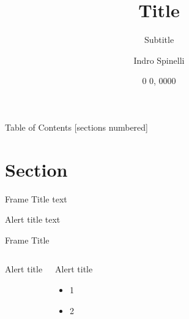 \documentclass[11pt,aspectratio=169]{beamer}
\title[Title]{Title}
\subtitle{Subtitle}
\date{0 0, 0000}
\author[I.Spinelli]{Indro Spinelli}
\institute[uniroma1]{Sapienza University of Rome}
\begin{document}
	
	\maketitle
    
	\begin{frame}{Table of Contents}
		[sections numbered]
		\tableofcontents[hideallsubsections]
	\end{frame}
    
	\section{Section}
    
	\begin{frame}{Frame Title}
	    text
		\begin{alertblock}{Alert title}
    		text
		\end{alertblock}
	\end{frame}
    
	\begin{frame}{Frame Title}
	
		\begin{columns}[T]
	        \begin{exampleblock}{Alert title}
		    \end{exampleblock}
			
			\begin{alertblock}{Alert title}
				\begin{itemize}
					\item<+->1
					\item<+-> 2
				\end{itemize}
			\end{alertblock}
		\end{columns}
	\end{frame}

	\appendix
	
\end{document}
